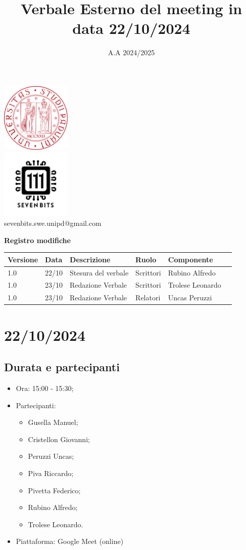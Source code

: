 \documentclass[12pt]{article}
\title{Verbale Esterno del meeting in data 22/10/2024}
\date{A.A 2024/2025}
\begin{document}
\maketitle
\center 
\includegraphics[width=0.25\textwidth]{LogoUnipd}\\
\includegraphics[width=0.25\textwidth]{Sevenbitslogo}\\
sevenbits.swe.unipd@gmail.com\\
\vspace{2mm}

\textbf{Registro modifiche}\\
\vspace{2mm}
\begin{tabular}{|l|l|l|l|l|l|}
\hline
\textbf{Versione} & \textbf{Data} & \textbf{Descrizione} & \textbf{Ruolo} & \textbf{Componente} \\
\hline
1.0 & 22/10 & Stesura del verbale & Scrittori & Rubino Alfredo\\
\hline
1.0 & 23/10 & Redazione Verbale & Scrittori & Trolese Leonardo\\
\hline
1.0 & 23/10 & Redazione Verbale & Relatori & Uncas Peruzzi\\
\hline
\end{tabular}

\raggedright
\tableofcontents
\newpage
\section{22/10/2024}
\subsection{Durata e partecipanti}
\begin{itemize}
\item Ora: 15:00 - 15:30;
\item Partecipanti: 
\begin{itemize}
\item Gusella Manuel;
\item Cristellon Giovanni;
\item Peruzzi Uncas;
\item Piva Riccardo;
\item Pivetta Federico;
\item Rubino Alfredo;
\item Trolese Leonardo.
\end{itemize}
\item Piattaforma: Google Meet (online)
\end{itemize}
\end{document}
